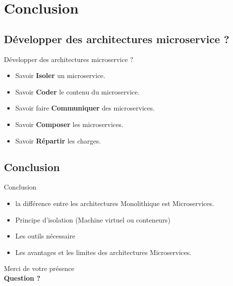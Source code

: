 \documentclass{beamer}
\begin{document}
\section{Conclusion}
\subsection{Développer des architectures microservice ?}
    \begin{frame}{Développer des architectures microservice ?}
        \begin{itemize} 
            \item Savoir \textbf{Isoler} un microservice.
            \item Savoir \textbf{Coder} le contenu du microservice.
            \item Savoir faire \textbf{Communiquer} des microservices.
            \item Savoir \textbf{Composer} les microservices.
            \item Savoir \textbf{Répartir} les charges.
        \end{itemize}

    \end{frame}
\subsection{Conclusion}
    \begin{frame}{Conclusion}
        \begin{itemize} 
            \item la différence entre les architectures  
                Monolithique est Microservices.
            \item Principe d'isolation (Machine virtuel ou conteneurs)
            \item Les outils nécessaire
            \item Les avantages et les limites des architectures Microservices.
        \end{itemize}

    \end{frame}
\begin{frame}
    \begin{center}
    Merci de votre présence\\
        \textbf{Question ?}
    \end{center}
\end{frame}
\end{document}

